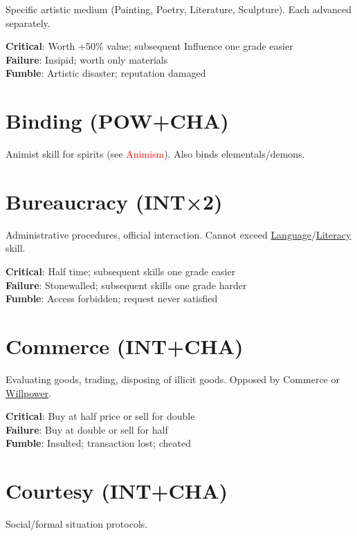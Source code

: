 \documentclass[10pt]{article}
\begin{document}
Specific artistic medium (Painting, Poetry, Literature, Sculpture). Each advanced separately.

\textbf{Critical}: Worth +50\% value; subsequent Influence one grade easier\\
\textbf{Failure}: Insipid; worth only materials\\
\textbf{Fumble}: Artistic disaster; reputation damaged

\section{Binding (POW+CHA)}
\label{skill:binding}

Animist skill for spirits (see \textcolor{red}{Animism}). Also binds elementals/demons.

\section{Bureaucracy (INT×2)}
\label{skill:bureaucracy}

Administrative procedures, official interaction. Cannot exceed \hyperref[skill:nativetongue]{Language}/\hyperref[skill:literacy]{Literacy} skill.

\textbf{Critical}: Half time; subsequent skills one grade easier\\
\textbf{Failure}: Stonewalled; subsequent skills one grade harder\\
\textbf{Fumble}: Access forbidden; request never satisfied

\section{Commerce (INT+CHA)}
\label{skill:commerce}

Evaluating goods, trading, disposing of illicit goods. Opposed by Commerce or \hyperref[skill:willpower]{Willpower}.

\textbf{Critical}: Buy at half price or sell for double\\
\textbf{Failure}: Buy at double or sell for half\\
\textbf{Fumble}: Insulted; transaction lost; cheated

\section{Courtesy (INT+CHA)}
\label{skill:courtesy}

Social/formal situation protocols.
\end{document}

